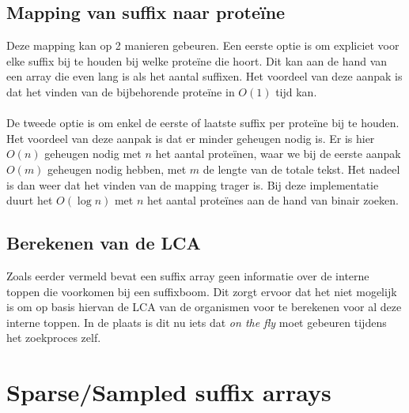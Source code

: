 \subsection{Mapping van suffix naar proteïne}\label{subsec:mapping-van-suffix-naar-proteine}
Deze mapping kan op 2 manieren gebeuren.
Een eerste optie is om expliciet voor elke suffix bij te houden bij welke proteïne die hoort.
Dit kan aan de hand van een array die even lang is als het aantal suffixen.
Het voordeel van deze aanpak is dat het vinden van de bijbehorende proteïne in $O(1)$ tijd kan.
\\ \\
De tweede optie is om enkel de eerste of laatste suffix per proteïne bij te houden.
Het voordeel van deze aanpak is dat er minder geheugen nodig is.
Er is hier $O(n)$ geheugen nodig met $n$ het aantal proteïnen, waar we bij de eerste aanpak $O(m)$ geheugen nodig hebben, met $m$ de lengte van de totale tekst.
Het nadeel is dan weer dat het vinden van de mapping trager is.
Bij deze implementatie duurt het $O(\log n)$ met $n$ het aantal proteïnes aan de hand van binair zoeken.

\subsection{Berekenen van de LCA}\label{subsec:berekenen-van-de-lca}
Zoals eerder vermeld bevat een suffix array geen informatie over de interne toppen die voorkomen bij een suffixboom.
Dit zorgt ervoor dat het niet mogelijk is om op basis hiervan de LCA van de organismen voor te berekenen voor al deze interne toppen.
In de plaats is dit nu iets dat \textit{on the fly} moet gebeuren tijdens het zoekproces zelf.


\section{Sparse/Sampled suffix arrays}\label{sec:sparse/sampled-suffix-arrays}



